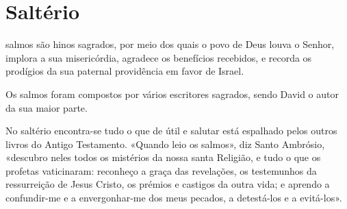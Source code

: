\section{Saltério}

 salmos são hinos sagrados, por meio dos quais o povo de Deus louva o Senhor, implora a sua misericórdia, agradece os benefícios recebidos, e recorda os prodígios da sua paternal providência em favor de Israel.\par
Os salmos foram compostos por vários escritores sagrados, sendo David o autor da sua maior parte.\par
No saltério encontra-se tudo o que de útil e salutar está espalhado pelos outros livros do Antigo Testamento. «Quando leio os salmos», diz Santo Ambrósio, «descubro neles todos os mistérios da nossa santa Religião, e tudo o que os profetas vaticinaram: reconheço a graça das revelações, os testemunhos da ressurreição de Jesus Cristo, os prémios e castigos da outra vida; e aprendo a confundir-me e a envergonhar-me dos meus pecados, a detestá-los e a evitá-los».\par

\label{salmo1}


\label{salmo2}


\label{salmo3}


\label{salmo4}


\label{salmo5}


\label{salmo6}


\label{salmo7}


\label{salmo8}


\label{salmo9}


\label{salmo10}


\label{salmo11}


